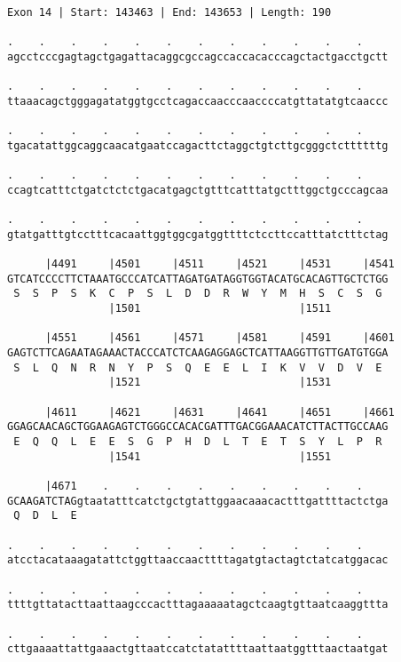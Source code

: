 \documentclass{article}
\begin{document}
\begin{Verbatim}[fontfamily=courier]
Exon 14 | Start: 143463 | End: 143653 | Length: 190

.    .    .    .    .    .    .    .    .    .    .    .    
agcctcccgagtagctgagattacaggcgccagccaccacacccagctactgacctgctt

.    .    .    .    .    .    .    .    .    .    .    .    
ttaaacagctgggagatatggtgcctcagaccaacccaaccccatgttatatgtcaaccc

.    .    .    .    .    .    .    .    .    .    .    .    
tgacatattggcaggcaacatgaatccagacttctaggctgtcttgcgggctcttttttg

.    .    .    .    .    .    .    .    .    .    .    .    
ccagtcatttctgatctctctgacatgagctgtttcatttatgctttggctgcccagcaa

.    .    .    .    .    .    .    .    .    .    .    .    
gtatgatttgtcctttcacaattggtggcgatggttttctccttccatttatctttctag

      |4491     |4501     |4511     |4521     |4531     |4541
GTCATCCCCTTCTAAATGCCCATCATTAGATGATAGGTGGTACATGCACAGTTGCTCTGG
 S  S  P  S  K  C  P  S  L  D  D  R  W  Y  M  H  S  C  S  G 
                |1501                         |1511         

      |4551     |4561     |4571     |4581     |4591     |4601
GAGTCTTCAGAATAGAAACTACCCATCTCAAGAGGAGCTCATTAAGGTTGTTGATGTGGA
 S  L  Q  N  R  N  Y  P  S  Q  E  E  L  I  K  V  V  D  V  E 
                |1521                         |1531         

      |4611     |4621     |4631     |4641     |4651     |4661
GGAGCAACAGCTGGAAGAGTCTGGGCCACACGATTTGACGGAAACATCTTACTTGCCAAG
 E  Q  Q  L  E  E  S  G  P  H  D  L  T  E  T  S  Y  L  P  R 
                |1541                         |1551         

      |4671    .    .    .    .    .    .    .    .    .    
GCAAGATCTAGgtaatatttcatctgctgtattggaacaaacactttgattttactctga
 Q  D  L  E                                                 

.    .    .    .    .    .    .    .    .    .    .    .    
atcctacataaagatattctggttaaccaacttttagatgtactagtctatcatggacac

.    .    .    .    .    .    .    .    .    .    .    .    
ttttgttatacttaattaagcccactttagaaaaatagctcaagtgttaatcaaggttta

.    .    .    .    .    .    .    .    .    .    .    .    
cttgaaaattattgaaactgttaatccatctatattttaattaatggtttaactaatgat

\end{Verbatim}
\end{document}
